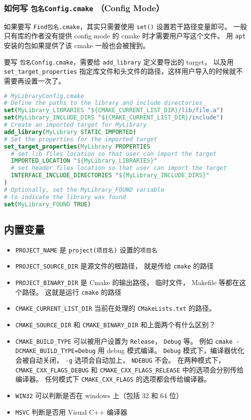 \subsubsection{如何写 \verb`包名Config.cmake` （Config Mode）}
如果要写 \verb`Find包名.cmake`，其实只需要使用 \verb`set()` 设置若干路径变量即可。 一般只有库的作者没有提供 config mode 的 cmake 时才需要用户写这个文件。 用 \verb`apt` 安装的包如果提供了该 cmake 一般也会被搜到。

要写 \verb`包名Config.cmake`，需要给 \verb`add_library` 定义要导出的 target， 以及用 \verb`set_target_properties` 指定库文件和头文件的路径，这样用户导入的时候就不需要再设置一次了。
\begin{lstlisting}[language=cmake]
# MyLibraryConfig.cmake
# Define the paths to the library and include directories
set(MyLibrary_LIBRARIES "${CMAKE_CURRENT_LIST_DIR}/lib/file.a")
set(MyLibrary_INCLUDE_DIRS "${CMAKE_CURRENT_LIST_DIR}/include")
# Create an imported target for MyLibrary
add_library(MyLibrary STATIC IMPORTED)
# Set the properties for the imported target
set_target_properties(MyLibrary PROPERTIES
  # set lib files location so that user can import the target
  IMPORTED_LOCATION "${MyLibrary_LIBRARIES}"
  # set header files location so that user can import the target
  INTERFACE_INCLUDE_DIRECTORIES "${MyLibrary_INCLUDE_DIRS}"
)
# Optionally, set the MyLibrary_FOUND variable
# to indicate the library was found
set(MyLibrary_FOUND TRUE)
\end{lstlisting}

\subsection{内置变量}
\begin{itemize}
\item \verb`PROJECT_NAME` 是 \verb`project(项目名)` 设置的\verb`项目名`
\item \verb`PROJECT_SOURCE_DIR` 是源文件的根路径， 就是传给 \verb`cmake` 的路径
\item \verb`PROJECT_BINARY_DIR` 是 Cmake 的输出路径， 临时文件， Makefile 等都在这个路径。 这就是运行 \verb`cmake` 的路径
\item \verb`CMAKE_CURRENT_LIST_DIR` 当前在处理的 \verb`CMakeLists.txt` 的路径。
\item \verb`CMAKE_SOURCE_DIR` 和 \verb`CMAKE_BINARY_DIR` 和上面两个有什么区别？
\item \verb`CMAKE_BUILD_TYPE` 可以被用户设置为 \verb`Release`， \verb`Debug` 等。 例如 \verb`cmake -DCMAKE_BUILD_TYPE=Debug` 用 debug 模式编译。 \verb`Debug` 模式下，编译器优化会被自动关闭， \verb`-g` 选项会自动加上， \verb`NDEBUG` 不会。 在两种模式下， \verb`CMAKE_CXX_FLAGS_DEBUG` 和 \verb`CMAKE_CXX_FLAGS_RELEASE` 中的选项会分别传给编译器。 任何模式下 \verb`CMAKE_CXX_FLAGS` 的选项都会传给编译器。
\item \verb`WIN32` 可以判断是否在 windows 上（包括 32 和 64 位）
\item \verb`MSVC` 判断是否用 Visual C++ 编译器
\end{itemize}

